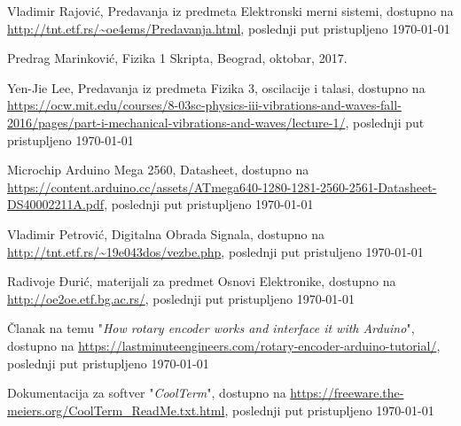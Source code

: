 
\begin{thebibliography}{9}

Vladimir Rajović, Predavanja iz predmeta Elektronski merni sistemi,
dostupno na \url{http://tnt.etf.rs/~oe4ems/Predavanja.html}, 
poslednji put pristupljeno \today

Predrag Marinković, Fizika 1 Skripta,
Beograd, oktobar, 2017.

Yen-Jie Lee, Predavanja iz predmeta Fizika 3, oscilacije i talasi,
dostupno na \url{https://ocw.mit.edu/courses/8-03sc-physics-iii-vibrations-and-waves-fall-2016/pages/part-i-mechanical-vibrations-and-waves/lecture-1/}, 
poslednji put pristupljeno \today

Microchip Arduino Mega 2560, Datasheet,
dostupno na \url{https://content.arduino.cc/assets/ATmega640-1280-1281-2560-2561-Datasheet-DS40002211A.pdf}, 
poslednji put pristupljeno \today

Vladimir Petrović, Digitalna Obrada Signala,
dostupno na \url{http://tnt.etf.rs/~19e043dos/vezbe.php},
poslednji put pristuljeno \today

Radivoje Đurić, materijali za predmet Osnovi Elektronike,
dostupno na \url{http://oe2oe.etf.bg.ac.rs/},
poslednji put pristupljeno \today

Članak na temu "\textit{How rotary encoder works and interface it with Arduino}",
dostupno na \url{https://lastminuteengineers.com/rotary-encoder-arduino-tutorial/},
poslednji put pristupljeno \today

Dokumentacija za softver "\textit{CoolTerm}",
dostupno na \url{https://freeware.the-meiers.org/CoolTerm_ReadMe.txt.html},
poslednji put pristupljeno \today



\end{thebibliography}

